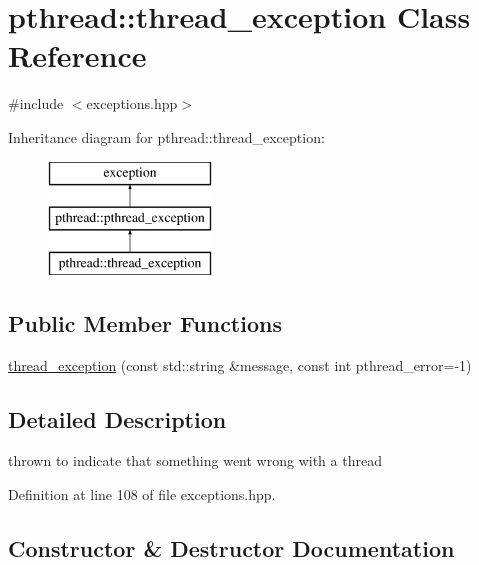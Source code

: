 \hypertarget{classpthread_1_1thread__exception}{}\section{pthread\+:\+:thread\+\_\+exception Class Reference}
\label{classpthread_1_1thread__exception}


{\ttfamily \#include $<$exceptions.\+hpp$>$}

Inheritance diagram for pthread\+:\+:thread\+\_\+exception\+:\begin{figure}[H]
\begin{center}
\leavevmode
\includegraphics[height=3.000000cm]{classpthread_1_1thread__exception}
\end{center}
\end{figure}
\subsection*{Public Member Functions}
\begin{DoxyCompactItemize}
\item 
\hyperlink{classpthread_1_1thread__exception_acdaadcbdcd315d86a4466d1be460a7b7}{thread\+\_\+exception} (const std\+::string \&message, const int pthread\+\_\+error=-\/1)
\end{DoxyCompactItemize}


\subsection{Detailed Description}
thrown to indicate that something went wrong with a thread 

Definition at line 108 of file exceptions.\+hpp.



\subsection{Constructor \& Destructor Documentation}
